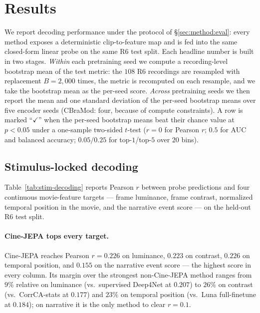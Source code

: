 
\section{Results}
\label{sec:results}

We report decoding performance under the protocol of
\S\ref{sec:method:eval}: every method exposes a deterministic
clip-to-feature map and is fed into the same closed-form linear
probe on the same R6 test split. Each headline number is built in
two stages. \emph{Within} each pretraining seed we compute a
recording-level bootstrap mean of the test metric: the $108$ R6
recordings are resampled with replacement $B = 2{,}000$ times,
the metric is recomputed on each resample, and we take the
bootstrap mean as the per-seed score. \emph{Across} pretraining
seeds we then report the mean and one standard deviation of the
per-seed bootstrap means over five encoder seeds (CBraMod: four,
because of compute constraints). A row is marked
``$\checkmark$'' when the per-seed bootstrap means beat their
chance value at $p < 0.05$ under a one-sample two-sided $t$-test
($r = 0$ for Pearson $r$; $0.5$ for AUC and balanced accuracy;
$0.05/0.25$ for top-$1$/top-$5$ over $20$ bins).

\subsection{Stimulus-locked decoding}
\label{sec:results:stim}

Table~\ref{tab:stim-decoding} reports Pearson $r$ between probe
predictions and four continuous movie-feature targets — frame
luminance, frame contrast, normalized temporal position in the
movie, and the narrative event score — on the held-out R6 test
split.



\paragraph{Cine-JEPA tops every target.}
Cine-JEPA reaches Pearson $r = 0.226$ on luminance, $0.223$ on
contrast, $0.226$ on temporal position, and $0.155$ on the
narrative event score — the highest score in every column. Its
margin over the strongest non-Cine-JEPA method ranges from $9\%$
relative on luminance (vs.\ supervised Deep4Net at $0.207$) to
$26\%$ on contrast (vs.\ CorrCA-stats at $0.177$) and $23\%$ on
temporal position (vs.\ Luna full-finetune at $0.184$); on
narrative it is the only method to clear $r = 0.1$.


